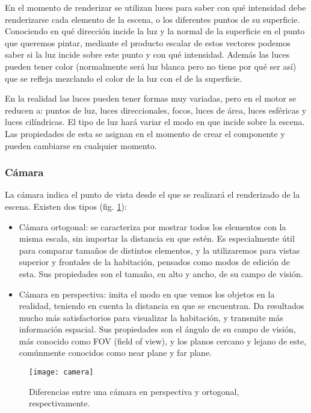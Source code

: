 En el momento de renderizar se utilizan luces para saber con qué intensidad debe renderizarse cada elemento de la escena, o los diferentes puntos de su superficie. Conociendo en qué dirección incide la luz y la normal de la superficie en el punto que queremos pintar, mediante el producto escalar de estos vectores podemos saber si la luz incide sobre este punto y con qué intensidad. Además las luces pueden tener color (normalmente será luz blanca pero no tiene por qué ser así) que se refleja mezclando el color de la luz con el de la superficie.

En la realidad las luces pueden tener formas muy variadas, pero en el motor se reducen a: puntos de luz, luces direccionales, focos, luces de área, luces esféricas y luces cilíndricas. El tipo de luz hará variar el modo en que incide sobre la escena. Las propiedades de esta se asignan en el momento de crear el componente y pueden cambiarse en cualquier momento.

\subsubsection{Cámara}
La cámara indica el punto de vista desde el que se realizará el renderizado de la escena. Existen dos tipos (fig. \ref{fig:camera}):

\begin{itemize}
    \item Cámara ortogonal: se caracteriza por mostrar todos los elementos con la misma escala, sin importar la distancia en que estén. Es especialmente útil para comparar tamaños de distintos elementos, y la utilizaremos para vistas superior y frontales de la habitación, pensados como modos de edición de esta. Sus propiedades son el tamaño, en alto y ancho, de su campo de visión.
    \item Cámara en perspectiva: imita el modo en que vemos los objetos en la realidad, teniendo en cuenta la distancia en que se encuentran. Da resultados mucho más satisfactorios para visualizar la habitación, y transmite más información espacial. Sus propiedades son el ángulo de su campo de visión, más conocido como FOV (field of view), y los planos cercano y lejano de este, comúnmente conocidos como near plane y far plane.
\end{itemize}

\begin{figure}[H]
    \centering
    \texttt{[image: camera]}
    \caption{Diferencias entre una cámara en perspectiva y ortogonal, respectivamente.}
    \label{fig:camera}
\end{figure}

